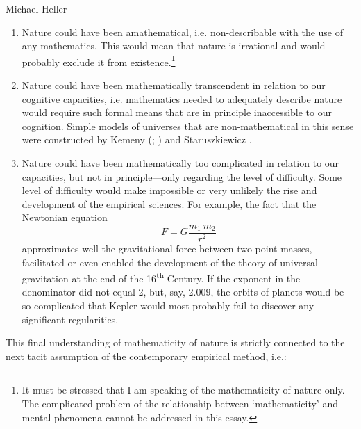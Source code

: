 \begin{artengenv}{Michael Heller}
\begin{enumerate}
\item Nature could have been amathematical, i.e. non-describable with the use of any mathematics. This would mean that
nature is irrational and would probably exclude it from existence.\footnote{It must be stressed that I am speaking of
the mathematicity of nature only. The complicated problem of the relationship between `mathematicity' and mental
phenomena cannot be addressed in this essay.}
\item Nature could have been mathematically transcendent in relation to our cognitive capacities, i.e. mathematics
needed to adequately describe nature would require such formal means that are in principle inaccessible to our
cognition. Simple models of universes that are non-mathematical in this sense were constructed by Kemeny
(\cite*{kemeny_philosopher_1959}; \cite[see also my study][pp.112--119]{heller_spotkania_1974})
and Staruszkiewicz
\parencite*{staruszkiewicz_co_1980}.
\item Nature could have been mathematically too complicated in relation to our capacities, but not in principle---only
regarding the level of difficulty. Some level of difficulty would make impossible or very unlikely the rise and
development of the empirical sciences. For example, the fact that the Newtonian equation
$$
F = G \frac{m_1\  m_2}{r^2}
$$
approximates well the gravitational force between two point masses, facilitated or even enabled the development of the
theory of universal gravitation at the end of the 16\textsuperscript{th} Century. If the exponent in the denominator
did not equal 2, but, say, 2.009, the orbits of planets would be so complicated that Kepler would most probably fail to
discover any significant regularities.
\end{enumerate}

This final understanding of mathematicity of nature is strictly connected to the next tacit assumption of the
contemporary empirical method, i.e.:


\end{artengenv}
